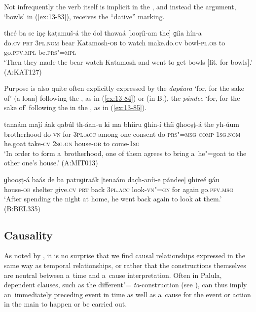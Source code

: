 Not infrequently the verb itself is implicit in the  , and instead the  argument, `bowls' in (\ref{ex:13-83}), receives the ``dative'' marking.

\begin{exe}
\ex
\label{ex:13-83}
\gll theé ba se iṇc̣ kaṭamuš-á the óol thawaá [looṛíi-am the] ɡíia hín-a \\
do.\textsc{cv} \textsc{prt} \textsc{3pl.nom} bear Katamosh-\textsc{ob} to watch  make.do.\textsc{cv} bowl-\textsc{pl.ob} to go.\textsc{pfv.mpl} be.\textsc{prs"=mpl} \\
\glt `Then they made the bear watch Katamosh and went to get bowls [lit. for bowls].' (A:KAT127) 
\end{exe}

Purpose is also quite often explicitly expressed by the  \textit{dapáara} `for, for the sake of' (a  loan) following the , as in (\ref{ex:13-84}) or (in B.), the  \textit{pándee} `for, for the sake of' following the  in the , as in (\ref{ex:13-85}).

\begin{exe}
\ex
\label{ex:13-84}
\gll [bhraawéeli th"=ainií dapáara] tanaám maǰí áak qabúl th-áan-u ki ma bhíiru ɡhin-í thíi ɡhooṣṭ-á the yh-úum \\
brotherhood do-\textsc{vn} for \textsc{3pl.acc} among one consent do-\textsc{prs"=msg} \textsc{comp} \textsc{1sg.nom} he.goat take-\textsc{cv} \textsc{2sg.gn}  house-\textsc{ob} to come-\textsc{1sg} \\
\glt `In order to form a~brotherhood, one of them agrees to bring a~he"=goat to the other one's house.' (A:MIT013)

\ex
\label{ex:13-85}
\gll ɡhooṣṭ-á baás de ba patuɡiraák [tenaám dac̣h-aníi-e pándee] ɡhireé ɡáu \\
house-\textsc{ob}  shelter give.\textsc{cv} \textsc{prt} back \textsc{3pl.acc}  look-\textsc{vn"=gn} for again go.\textsc{pfv.msg} \\
\glt `After spending the night at home, he went back again to look at them.' (B:BEL335)
\end{exe}

\subsection{Causality}
\label{subsec:13-4-3}

As noted by \citet[247]{thompsonetal2007}, it is no surprise that we find causal relationships expressed in the same way as temporal relationships, or rather that the constructions themselves are neutral between a~time and a~cause interpretation. Often in Palula, dependent clauses, such as the different"= \textit{ta}-construction (see ), can thus imply an~immediately preceding event in time as well as a~cause for the event or action in the main  to happen or be carried out. 



